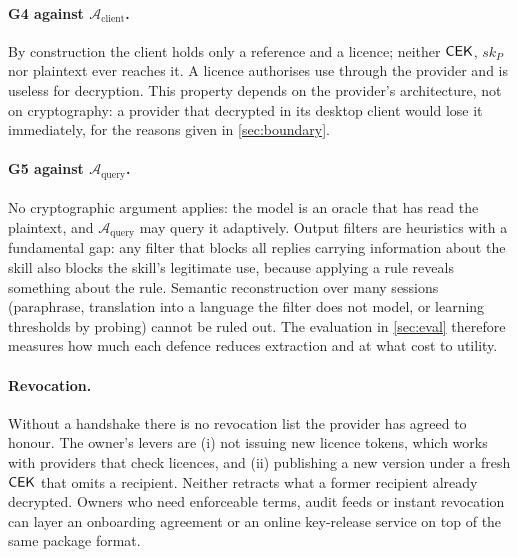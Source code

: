 \paragraph{G4 against $\mathcal{A}_{\text{client}}$.} By construction the client holds only a
reference and a licence; neither $\mathsf{CEK}$, $sk_P$ nor plaintext ever reaches it. A licence authorises
use through the provider and is useless for decryption. This property depends on the provider's
architecture, not on cryptography: a provider that decrypted in its desktop client would lose it
immediately, for the reasons given in \cref{sec:boundary}.

\paragraph{G5 against $\mathcal{A}_{\text{query}}$.} No cryptographic argument applies: the model
is an oracle that has read the plaintext, and $\mathcal{A}_{\text{query}}$ may query it adaptively.
Output filters are heuristics with a fundamental gap: any filter that blocks all replies carrying
information about the skill also blocks the skill's legitimate use, because applying a rule
reveals something about the rule. Semantic reconstruction over many sessions (paraphrase,
translation into a language the filter does not model, or learning thresholds by probing) cannot
be ruled out. The evaluation in \cref{sec:eval} therefore measures how much each defence reduces
extraction and at what cost to utility.

\paragraph{Revocation.}
Without a handshake there is no revocation list the provider has agreed to honour. The owner's
levers are (i) not issuing new licence tokens, which works with providers that check licences, and
(ii) publishing a new version under a fresh $\mathsf{CEK}$ that omits a recipient. Neither retracts what a
former recipient already decrypted. Owners who need enforceable terms, audit feeds or instant
revocation can layer an onboarding agreement or an online key-release service on top of the same
package format.

